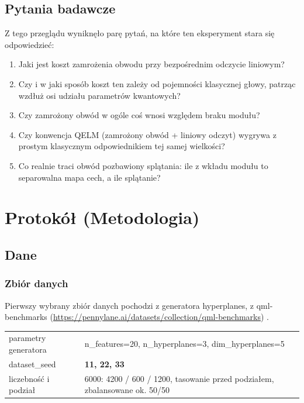 \documentclass[11pt, a4paper]{article}
\begin{document}
\subsection{Pytania badawcze}
Z tego przeglądu wyniknęło parę pytań, na które ten eksperyment stara się odpowiedzieć:

\begin{enumerate}
    \item Jaki jest koszt zamrożenia obwodu przy bezpośrednim odczycie liniowym?
    \item Czy i w jaki sposób koszt ten zależy od pojemności klasycznej głowy, patrząc wzdłuż osi udziału parametrów kwantowych?
    \item Czy zamrożony obwód w ogóle coś wnosi względem braku modułu?
    \item Czy konwencja QELM (zamrożony obwód + liniowy odczyt) wygrywa z prostym klasycznym odpowiednikiem tej samej wielkości?
    \item Co realnie traci obwód pozbawiony splątania: ile z wkładu modułu to separowalna mapa cech, a ile splątanie?
\end{enumerate}

\section{Protokół (Metodologia)}
\subsection{Dane}

\subsubsection{Zbiór danych}
Pierwszy wybrany zbiór danych pochodzi z generatora hyperplanes, z qml-benchmarks (\url{https://pennylane.ai/datasets/collection/qml-benchmarks}) \citep{bowles2024, qmlbenchmarks2024}.

\begin{table}[H]
\centering
\renewcommand{\arraystretch}{1.3}
\begin{tabularx}{\textwidth}{lX}
\toprule
parametry generatora & n\_features=20, n\_hyperplanes=3, dim\_hyperplanes=5 \\
dataset\_seed & \textbf{11, 22, 33} \\
liczebność i podział & 6000: 4200 / 600 / 1200, tasowanie przed podziałem, zbalansowane ok. 50/50\\
\bottomrule
\end{tabularx}
\end{table}
\end{document}
